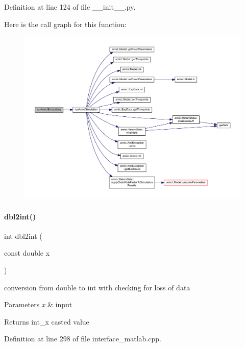 Definition at line 124 of file \+\_\+\+\_\+init\+\_\+\+\_\+.\+py.

Here is the call graph for this function\+:
\nopagebreak
\begin{figure}[H]
\begin{center}
\leavevmode
\includegraphics[width=350pt]{namespaceamici_ae2594036341d383b9e373ae7da67fc8a_cgraph}
\end{center}
\end{figure}
\mbox{\label{namespaceamici_a204c68962100d0020a37392fef2e95e2}} 
\paragraph{\texorpdfstring{dbl2int()}{dbl2int()}}
{\footnotesize\ttfamily int dbl2int (\begin{DoxyParamCaption}\item[{const double}]{x }\end{DoxyParamCaption})}

conversion from double to int with checking for loss of data 
\begin{DoxyParams}{Parameters}
{\em x} & input \\
\hline
\end{DoxyParams}
\begin{DoxyReturn}{Returns}
int\+\_\+x casted value 
\end{DoxyReturn}


Definition at line 298 of file interface\+\_\+matlab.\+cpp.


